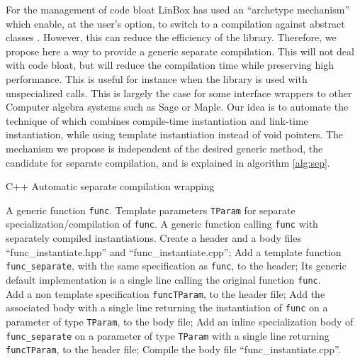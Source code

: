 \documentclass[runningheads,a4paper]{llncs}
\newcommand{\linbox}{{\sc LinBox}\xspace}
\begin{document}
For the management of code bloat \linbox has used an ``archetype
mechanism'' which enable, at the user's option, to switch to a
compilation against abstract classes \cite[\S 2.1]{jgd:2002:icms}.
However, this can reduce the efficiency of the library. Therefore, we propose
here a way to provide a generic separate compilation. This will not
deal with code bloat, but will reduce the compilation time while
preserving high performance.
This is useful for instance when the library is used with
unspecialized calls. This is largely the case for some interface
wrappers to other Computer algebra systems such as {\sc Sage} or {\sc Maple}.
Our idea is to automate the technique of
\cite{Erlingsson:1996:issac} which combines compile-time instantiation
and link-time instantiation, while using template instantiation
instead of void pointers.
The mechanism we propose is independent of the desired generic method,
the candidate
for separate compilation, and is explained in algorithm \ref{alg:sep}.
\vspace{-10pt}\begin{algorithm}[ht]
\caption{C++ Automatic separate compilation wrapping}\label{alg:sep}
\begin{algorithmic}[1]
\REQUIRE A generic function \texttt{func}.
\REQUIRE Template parameters \texttt{TParam} for separate
specialization/compilation of \texttt{func}.
\ENSURE A generic function calling
\texttt{func} with separately compiled instantiations.
\STATE Create a header and a body files ``func\_instantiate.hpp'' and ``func\_instantiate.cpp'';
\STATE Add a template function \texttt{func\_separate}, with the same
specification as \texttt{func}, to the header;
\STATE Its generic default implementation is a single line calling the
original function \texttt{func}.\\ 
  \STATE Add  a non template specification
  \texttt{funcTParam}, to the header file;
  \STATE Add the associated body with a
  single line returning the instantiation of
  \texttt{func} on a parameter of type \texttt{TParam}, to the body file;
  \STATE Add an inline specialization
  body of \texttt{func\_separate} on a parameter of type
  \texttt{TParam} with a single line returning \texttt{funcTParam}, to
  the header file; 
\ENDFOR
\STATE Compile the body file ``func\_instantiate.cpp''.
\end{algorithmic}
\end{algorithm}\vspace{-10pt}
\end{document}
